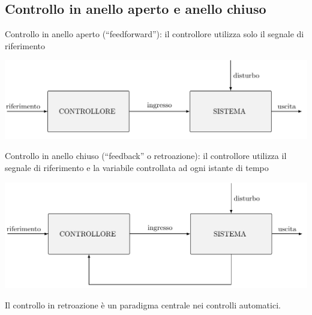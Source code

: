 \documentclass{article}
\begin{document}
\subsection{Controllo in anello aperto e anello chiuso}
Controllo in anello aperto (“feedforward”): il controllore utilizza solo il segnale di riferimento
\begin{center}
    \includegraphics[scale=0.32]{Images/Anello_aperto.png}
\end{center}
Controllo in anello chiuso (“feedback” o retroazione): il controllore utilizza il segnale di riferimento e la variabile controllata ad ogni istante di tempo
\begin{center}
    \includegraphics[scale=0.3]{Images/Anello_chiuso.png}
\end{center}
Il controllo in retroazione è un paradigma centrale nei controlli automatici.
\end{document}
